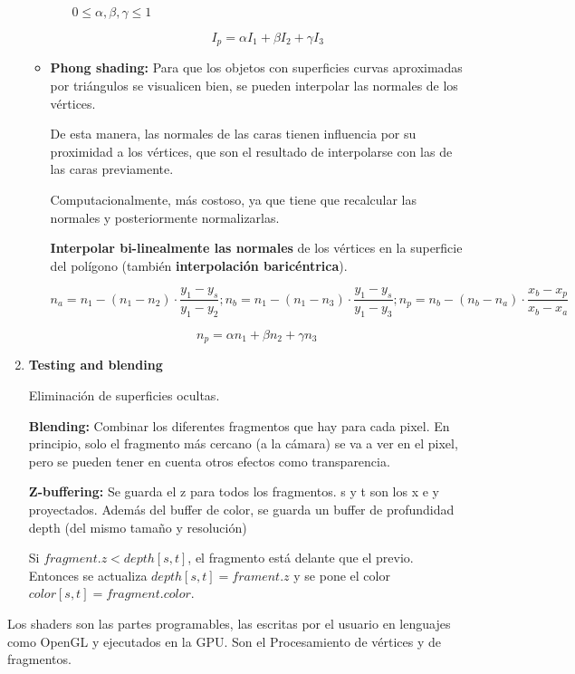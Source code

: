 \begin{enumerate}
\begin{itemize}
\begin{itemize}
            $0\leq \alpha, \beta, \gamma \leq 1$
    
            $$I_p=\alpha I_1 + \beta I_2 + \gamma I_3$$
        \end{itemize}
        \item \textbf{Phong shading:} Para que los objetos con superficies curvas aproximadas por triángulos se visualicen bien, se pueden interpolar las normales de los vértices.
        
        De esta manera, las normales de las caras tienen influencia por su proximidad a los vértices, que son el resultado de interpolarse con las de las caras previamente.

        Computacionalmente, más costoso, ya que tiene que recalcular las normales y posteriormente normalizarlas.

        \textbf{Interpolar bi-linealmente las normales} de los vértices en la superficie del polígono (también \textbf{interpolación baricéntrica}).

        $$n_a =  n_1 - (n_1 - n_2) \cdot \frac{y_1-y_s}{y_1 - y_2};
        n_b =  n_1 - (n_1 - n_3) \cdot \frac{y_1-y_s}{y_1 - y_3};
        n_p =  n_b - (n_b - n_a) \cdot \frac{x_b - x_p}{x_b-x_a}$$

        $$n_p=\alpha n_1 + \beta n_2 + \gamma n_3$$
    \end{itemize}


    \item \textbf{Testing and blending}
    
    Eliminación de superficies ocultas.

    \textbf{Blending:} Combinar los diferentes fragmentos que hay para cada pixel. En principio, solo el fragmento más cercano (a la cámara) se va a ver en el pixel, pero se pueden tener en cuenta otros efectos como transparencia.
    
    \textbf{Z-buffering:} Se guarda el z para todos los fragmentos. s y t son los x e y proyectados. Además del buffer de color, se guarda un buffer de profundidad depth (del mismo tamaño y resolución)

    Si $fragment.z < depth[s,t]$, el fragmento está delante que el previo. Entonces se actualiza $depth[s,t] = frament.z$ y se pone el color $color[s,t] = fragment.color$.
\end{enumerate}

Los shaders son las partes programables, las escritas por el usuario en lenguajes como OpenGL y ejecutados en la GPU. Son el Procesamiento de vértices y de fragmentos.

